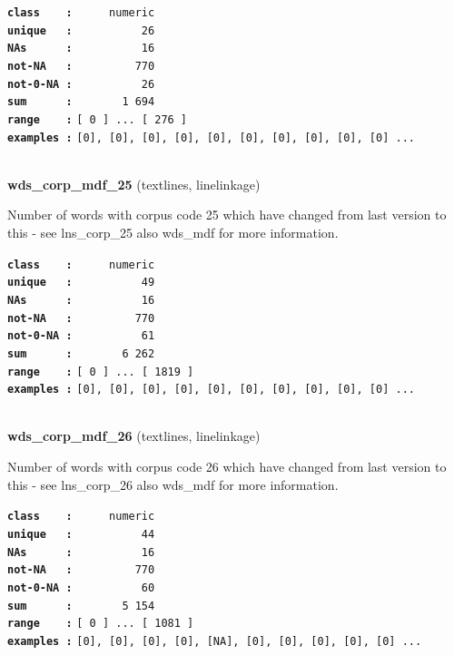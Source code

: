 \documentclass[]{article}
\begin{document}
\textbf{\texttt{class\ \ \ \ :}} \texttt{~~~~~numeric}\\
\textbf{\texttt{unique\ \ \ :}} \texttt{~~~~~~~~~~26}\\
\textbf{\texttt{NAs\ \ \ \ \ \ :}} \texttt{~~~~~~~~~~16}\\
\textbf{\texttt{not-NA\ \ \ :}} \texttt{~~~~~~~~~770}\\
\textbf{\texttt{not-0-NA\ :}} \texttt{~~~~~~~~~~26}\\
\textbf{\texttt{sum\ \ \ \ \ \ :}} \texttt{~~~~~~~1~694}\\
\textbf{\texttt{range\ \ \ \ :}}
\texttt{{[}\ 0\ {]}\ ...\ {[}\ 276\ {]}}\\
\textbf{\texttt{examples\ :}}
\texttt{{[}0{]},\ {[}0{]},\ {[}0{]},\ {[}0{]},\ {[}0{]},\ {[}0{]},\ {[}0{]},\ {[}0{]},\ {[}0{]},\ {[}0{]}\ ...}\\

~

\textbf{wds\_corp\_mdf\_25} (textlines, linelinkage)

Number of words with corpus code 25 which have changed from last version
to this - see lns\_corp\_25 also wds\_mdf for more information.

\textbf{\texttt{class\ \ \ \ :}} \texttt{~~~~~numeric}\\
\textbf{\texttt{unique\ \ \ :}} \texttt{~~~~~~~~~~49}\\
\textbf{\texttt{NAs\ \ \ \ \ \ :}} \texttt{~~~~~~~~~~16}\\
\textbf{\texttt{not-NA\ \ \ :}} \texttt{~~~~~~~~~770}\\
\textbf{\texttt{not-0-NA\ :}} \texttt{~~~~~~~~~~61}\\
\textbf{\texttt{sum\ \ \ \ \ \ :}} \texttt{~~~~~~~6~262}\\
\textbf{\texttt{range\ \ \ \ :}}
\texttt{{[}\ 0\ {]}\ ...\ {[}\ 1819\ {]}}\\
\textbf{\texttt{examples\ :}}
\texttt{{[}0{]},\ {[}0{]},\ {[}0{]},\ {[}0{]},\ {[}0{]},\ {[}0{]},\ {[}0{]},\ {[}0{]},\ {[}0{]},\ {[}0{]}\ ...}\\

~

\textbf{wds\_corp\_mdf\_26} (textlines, linelinkage)

Number of words with corpus code 26 which have changed from last version
to this - see lns\_corp\_26 also wds\_mdf for more information.

\textbf{\texttt{class\ \ \ \ :}} \texttt{~~~~~numeric}\\
\textbf{\texttt{unique\ \ \ :}} \texttt{~~~~~~~~~~44}\\
\textbf{\texttt{NAs\ \ \ \ \ \ :}} \texttt{~~~~~~~~~~16}\\
\textbf{\texttt{not-NA\ \ \ :}} \texttt{~~~~~~~~~770}\\
\textbf{\texttt{not-0-NA\ :}} \texttt{~~~~~~~~~~60}\\
\textbf{\texttt{sum\ \ \ \ \ \ :}} \texttt{~~~~~~~5~154}\\
\textbf{\texttt{range\ \ \ \ :}}
\texttt{{[}\ 0\ {]}\ ...\ {[}\ 1081\ {]}}\\
\textbf{\texttt{examples\ :}}
\texttt{{[}0{]},\ {[}0{]},\ {[}0{]},\ {[}0{]},\ {[}NA{]},\ {[}0{]},\ {[}0{]},\ {[}0{]},\ {[}0{]},\ {[}0{]}\ ...}\\
\end{document}
